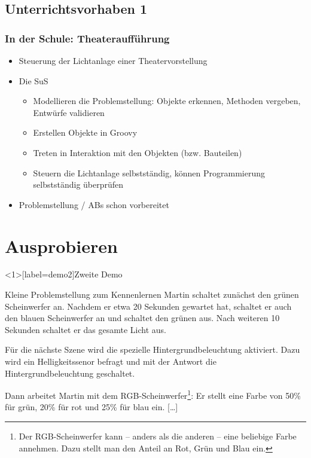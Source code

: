 \documentclass[usenames,dvipsnames]{beamer}
\begin{document}

\subsection{Unterrichtsvorhaben 1}


\begin{frame}
\frametitle{In der Schule: Theateraufführung}
\begin{itemize}
\item Steuerung der Lichtanlage einer Theatervorstellung
\item Die SuS
\begin{itemize}
\item Modellieren die Problemstellung: Objekte erkennen, Methoden vergeben, Entwürfe validieren
\item Erstellen Objekte in Groovy
\item Treten in Interaktion mit den Objekten (bzw. Bauteilen)
\item Steuern die Lichtanlage selbstständig, können Programmierung selbstständig überprüfen 
\end{itemize}
\item Problemstellung / ABs schon vorbereitet
\end{itemize}
\end{frame}


\section{Ausprobieren}


\begin{frame}<1>[label=demo2]{Zweite Demo}
	\begin{block}{Kleine Problemstellung zum Kennenlernen}
		Martin schaltet zunächst den grünen Scheinwerfer an. Nachdem er etwa 20 Sekunden gewartet hat, schaltet er auch den blauen Scheinwerfer an und schaltet den grünen aus. Nach weiteren 10 Sekunden schaltet er das gesamte Licht aus.
		\vspace{0.8em}

		Für die nächste Szene wird die spezielle Hintergrundbeleuchtung aktiviert. Dazu wird ein Helligkeitssenor befragt und mit der Antwort die Hintergrundbeleuchtung geschaltet.
		\vspace{0.8em}

		Dann arbeitet Martin mit dem RGB-Scheinwerfer\footnote{Der RGB-Scheinwerfer kann -- anders als die anderen -- eine beliebige Farbe annehmen. Dazu stellt man den Anteil an Rot, Grün und Blau ein.}: Er stellt eine Farbe von 50\% für grün, 20\% für rot und 25\% für blau ein. [\ldots]
	\end{block}
\end{frame}
\end{document}
